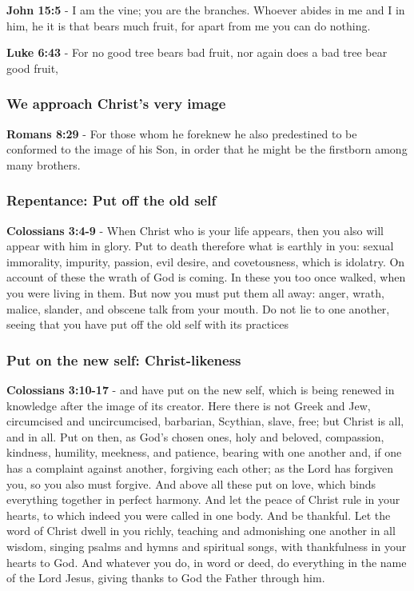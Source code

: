 \documentclass[11pt]{article}
\begin{document}
\textbf{John 15:5} - I am the vine; you are the branches. Whoever abides in me and I in him, he it is that bears much fruit, for apart from me you can do nothing.

\textbf{Luke 6:43} - For no good tree bears bad fruit, nor again does a bad tree bear good fruit,

\subsubsection{We approach Christ's very image}
\label{sec:org1b5d585}
\textbf{Romans 8:29} - For those whom he foreknew he also predestined to be conformed to the image of his Son, in order that he might be the firstborn among many brothers.

\subsubsection{Repentance: Put off the old self}
\label{sec:org60cc9b7}
\textbf{Colossians 3:4-9} - When Christ who is your life appears, then you also will appear with him in glory. Put to death therefore what is earthly in you: sexual immorality, impurity, passion, evil desire, and covetousness, which is idolatry. On account of these the wrath of God is coming. In these you too once walked, when you were living in them. But now you must put them all away: anger, wrath, malice, slander, and obscene talk from your mouth. Do not lie to one another, seeing that you have put off the old self with its practices

\subsubsection{Put on the new self: Christ-likeness}
\label{sec:org9359754}
\textbf{Colossians 3:10-17} - and have put on the new self, which is being renewed in knowledge after the image of its creator. Here there is not Greek and Jew, circumcised and uncircumcised, barbarian, Scythian, slave, free; but Christ is all, and in all. Put on then, as God's chosen ones, holy and beloved, compassion, kindness, humility, meekness, and patience, bearing with one another and, if one has a complaint against another, forgiving each other; as the Lord has forgiven you, so you also must forgive. And above all these put on love, which binds everything together in perfect harmony. And let the peace of Christ rule in your hearts, to which indeed you were called in one body. And be thankful. Let the word of Christ dwell in you richly, teaching and admonishing one another in all wisdom, singing psalms and hymns and spiritual songs, with thankfulness in your hearts to God. And whatever you do, in word or deed, do everything in the name of the Lord Jesus, giving thanks to God the Father through him.
\end{document}
